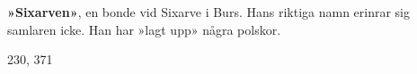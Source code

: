 \textbf{»Sixarven»}, en bonde vid Sixarve i Burs. Hans riktiga namn erinrar sig samlaren icke. Han har »lagt upp» några polskor.

230, 371
